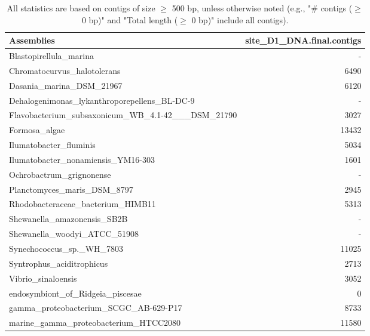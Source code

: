 \documentclass[12pt,a4paper]{article}
\begin{document}
\begin{table}[ht]
\begin{center}
\caption{All statistics are based on contigs of size $\geq$ 500 bp, unless otherwise noted (e.g., "\# contigs ($\geq$ 0 bp)" and "Total length ($\geq$ 0 bp)" include all contigs).}
\begin{tabular}{|l*{1}{|r}|}
\hline
Assemblies & site\_D1\_DNA.final.contigs \\ \hline
Blastopirellula\_marina & - \\ \hline
Chromatocurvus\_halotolerans & 6490 \\ \hline
Dasania\_marina\_DSM\_21967 & 6120 \\ \hline
Dehalogenimonas\_lykanthroporepellens\_BL-DC-9 & - \\ \hline
Flavobacterium\_subsaxonicum\_WB\_4.1-42\_\_\_DSM\_21790 & 3027 \\ \hline
Formosa\_algae & 13432 \\ \hline
Ilumatobacter\_fluminis & 5034 \\ \hline
Ilumatobacter\_nonamiensis\_YM16-303 & 1601 \\ \hline
Ochrobactrum\_grignonense & - \\ \hline
Planctomyces\_maris\_DSM\_8797 & 2945 \\ \hline
Rhodobacteraceae\_bacterium\_HIMB11 & 5313 \\ \hline
Shewanella\_amazonensis\_SB2B & - \\ \hline
Shewanella\_woodyi\_ATCC\_51908 & - \\ \hline
Synechococcus\_sp.\_WH\_7803 & 11025 \\ \hline
Syntrophus\_aciditrophicus & 2713 \\ \hline
Vibrio\_sinaloensis & 3052 \\ \hline
endosymbiont\_of\_Ridgeia\_piscesae & 0 \\ \hline
gamma\_proteobacterium\_SCGC\_AB-629-P17 & 8733 \\ \hline
marine\_gamma\_proteobacterium\_HTCC2080 & 11580 \\ \hline
\end{tabular}
\end{center}
\end{table}
\end{document}
